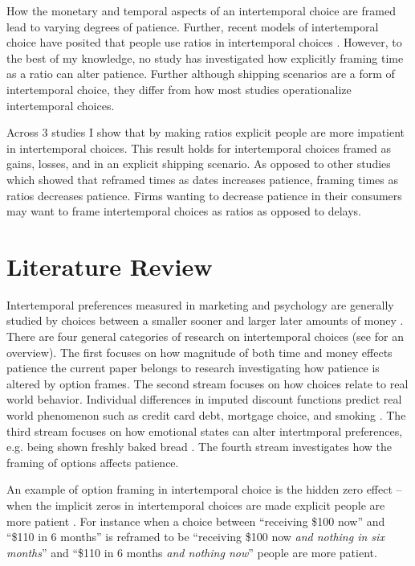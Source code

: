 \documentclass[]{article}
\begin{document}
How the monetary and temporal aspects of an intertemporal choice are framed lead to varying degrees of patience.
Further, recent models of intertemporal choice have posited that people use ratios in intertemporal choices \cite{Read2013, MarzilliEricson2015}. 
However, to the best of my knowledge, no study has investigated how explicitly framing time as a ratio can alter patience.
Further although shipping scenarios are a form of intertemporal choice, they differ from how most studies operationalize intertemporal choices. 

Across 3 studies I show that by making ratios explicit people are more impatient in intertemporal choices. 
This result holds for intertemporal choices framed as gains, losses, and in an explicit shipping scenario. 
As opposed to other studies which showed that reframed times as dates increases patience, framing times as ratios decreases patience.
Firms wanting to decrease patience in their consumers may want to frame intertemporal choices as ratios as opposed to delays.
 

\section{Literature Review}

Intertemporal preferences measured in marketing and psychology are generally studied by choices between a smaller sooner and larger later amounts of money \cite{Zauberman2014}. 
There are four general categories of research on  intertemporal choices (see  for an overview).
The first focuses on how magnitude of both time and money effects patience \cite{Scholten2006, Thaler1981}
the current paper belongs to research investigating how patience is altered by option frames. 
The second stream focuses on how choices relate to real world behavior.
Individual differences in imputed discount functions predict real world phenomenon such as credit card debt,  mortgage choice, and smoking \cite{MacKillop2011, Meier2009, Johnson2011}. 
The third stream focuses on how emotional states can alter intertmporal preferences, e.g. being shown freshly baked bread \cite{Li2008}. 
The fourth stream investigates how the framing of options affects patience. 

An example of option framing in intertemporal choice is the hidden zero effect -- when the implicit zeros in intertemporal choices are made explicit people are more patient \cite{Magen2008}. 
For instance when a choice between ``receiving \$100 now'' and ``\$110 in 6 months'' is reframed to be  ``receiving \$100 now \textit{and nothing in six months}'' and ``\$110 in 6 months \textit{and nothing now}'' people are more patient. 
\end{document}
